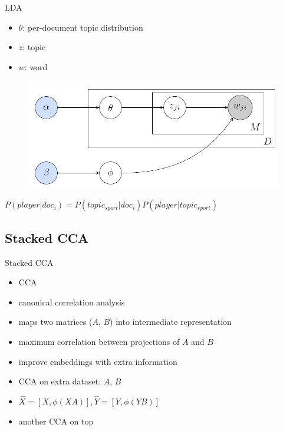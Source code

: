 \documentclass[16pt]{beamer}
\newenvironment{wideitemize}{\itemize\addtolength{\itemsep}{10pt}}{\enditemize}
\begin{document}
\begin{frame}{LDA}
\begin{itemize}
\item $\theta$: per-document topic distribution
\item $z$: topic
\item $w$: word
\end{itemize}
\begin{figure}[tb]
           \centering
           \includegraphics[width=0.6\linewidth]{lda.png}
           \end{figure}
$P(player|doc_i) = P(topic_{sport} | doc_i) P(player | topic_{sport})$

\end{frame}

\subsection{Stacked CCA}%
\begin{frame}{Stacked CCA \cite{Gong2014}}
\begin{itemize}
\item CCA
    \begin{wideitemize}
    \item canonical correlation analysis
    \item maps two matrices ($A$, $B$) into intermediate representation
    \item maximum correlation between projections of $A$ and $B$ 
    \end{wideitemize}
\item improve embeddings with extra information
\begin{wideitemize}
\item CCA on extra dataset: $A$, $B$
\item $\hat X = [ X, \phi(XA)], \hat Y = [ Y, \phi(YB)]$
\item another CCA on top

\end{wideitemize}

\end{itemize}

\end{frame}
\end{document}
